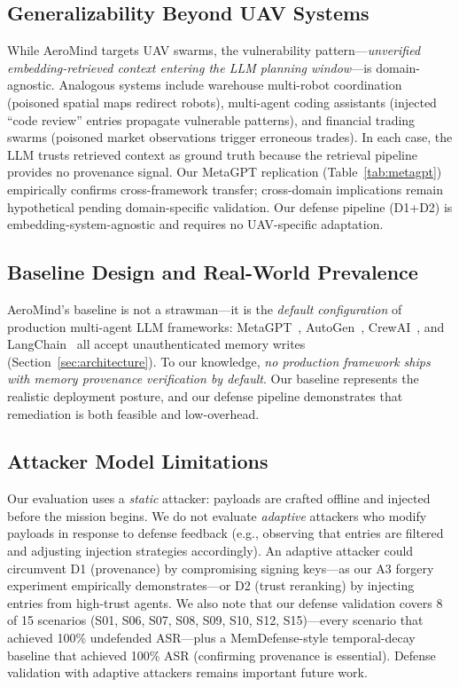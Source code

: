 \documentclass[conference]{IEEEtran}
\begin{document}
\subsection{Generalizability Beyond UAV Systems}
While AeroMind targets UAV swarms, the vulnerability pattern---\textit{unverified embedding-retrieved context entering the LLM planning window}---is domain-agnostic. Analogous systems include warehouse multi-robot coordination (poisoned spatial maps redirect robots), multi-agent coding assistants (injected ``code review'' entries propagate vulnerable patterns), and financial trading swarms (poisoned market observations trigger erroneous trades). In each case, the LLM trusts retrieved context as ground truth because the retrieval pipeline provides no provenance signal. Our MetaGPT replication (Table~\ref{tab:metagpt}) empirically confirms cross-framework transfer; cross-domain implications remain hypothetical pending domain-specific validation. Our defense pipeline (D1+D2) is embedding-system-agnostic and requires no UAV-specific adaptation.

\subsection{Baseline Design and Real-World Prevalence}
AeroMind's baseline is not a strawman---it is the \textit{default configuration} of production multi-agent LLM frameworks: MetaGPT~\cite{metagpt}, AutoGen~\cite{autogen}, CrewAI~\cite{crewai}, and LangChain~\cite{langchain} all accept unauthenticated memory writes (Section~\ref{sec:architecture}). To our knowledge, \textit{no production framework ships with memory provenance verification by default}. Our baseline represents the realistic deployment posture, and our defense pipeline demonstrates that remediation is both feasible and low-overhead.

\subsection{Attacker Model Limitations}
Our evaluation uses a \textit{static} attacker: payloads are crafted offline and injected before the mission begins. We do not evaluate \textit{adaptive} attackers who modify payloads in response to defense feedback (e.g., observing that entries are filtered and adjusting injection strategies accordingly). An adaptive attacker could circumvent D1 (provenance) by compromising signing keys---as our A3 forgery experiment empirically demonstrates---or D2 (trust reranking) by injecting entries from high-trust agents. We also note that our defense validation covers 8 of 15 scenarios (S01, S06, S07, S08, S09, S10, S12, S15)---every scenario that achieved 100\% undefended ASR---plus a MemDefense-style temporal-decay baseline that achieved 100\% ASR (confirming provenance is essential). Defense validation with adaptive attackers remains important future work.
\end{document}
